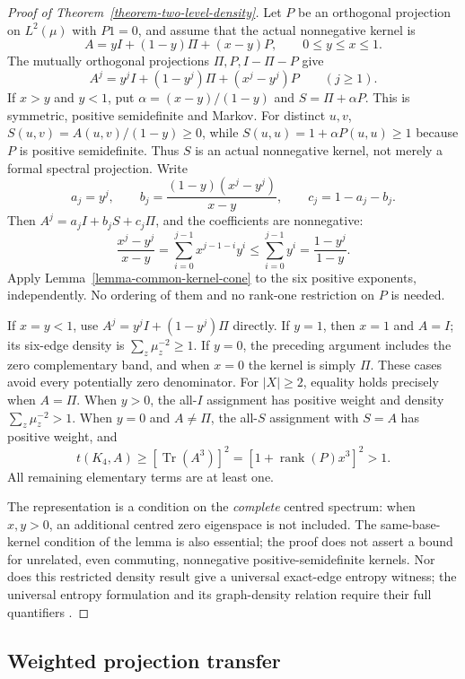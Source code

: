\documentclass[a4paper,11pt,reqno]{amsart}
\theoremstyle{plain}
\theoremstyle{definition}
\theoremstyle{remark}
\begin{document}
\begin{proof}[Proof of Theorem~\ref{theorem-two-level-density}]
Let $P$ be an orthogonal projection on $L^2(\mu)$ with $P1=0$, and assume
that the actual nonnegative kernel is
\[
 A=yI+(1-y)\Pi+(x-y)P,\qquad 0\le y\le x\le1.
\]
The mutually orthogonal projections $\Pi,P,I-\Pi-P$ give
\[
 A^j=y^jI+(1-y^j)\Pi+(x^j-y^j)P\qquad(j\ge1).
\]
If $x>y$ and $y<1$, put
$\alpha=(x-y)/(1-y)$ and $S=\Pi+\alpha P$.
This is symmetric, positive semidefinite and Markov.  For distinct
$u,v$, $S(u,v)=A(u,v)/(1-y)\ge0$, while
$S(u,u)=1+\alpha P(u,u)\ge1$ because $P$ is positive semidefinite.
Thus $S$ is an actual nonnegative kernel, not merely a formal spectral
projection.  Write
\[
 a_j=y^j,\qquad b_j=\frac{(1-y)(x^j-y^j)}{x-y},\qquad
 c_j=1-a_j-b_j.
\]
Then $A^j=a_jI+b_jS+c_j\Pi$, and the coefficients are nonnegative:
\[
 \frac{x^j-y^j}{x-y}
   =\sum_{i=0}^{j-1}x^{j-1-i}y^i
   \le\sum_{i=0}^{j-1}y^i=\frac{1-y^j}{1-y}.
\]
Apply Lemma~\ref{lemma-common-kernel-cone} to the six positive exponents,
independently.  No ordering of them and no rank-one restriction on $P$
is needed.

If $x=y<1$, use $A^j=y^jI+(1-y^j)\Pi$ directly.  If $y=1$, then
$x=1$ and $A=I$; its six-edge density is
$\sum_z\mu_z^{-2}\ge1$.  If $y=0$, the preceding argument includes
the zero complementary band, and when $x=0$ the kernel is simply $\Pi$.
These cases avoid every potentially zero denominator.
For $|X|\ge2$, equality holds precisely when $A=\Pi$.
When $y>0$, the all-$I$ assignment has positive weight and density
$\sum_z\mu_z^{-2}>1$.  When $y=0$ and $A\ne\Pi$, the all-$S$
assignment with $S=A$ has positive weight, and
\[
 t(K_4,A)\ge[\operatorname{Tr}(A^3)]^2
           =[1+\operatorname{rank}(P)x^3]^2>1.
\]
All remaining elementary terms are at least one.

The representation is a condition on the \emph{complete} centred spectrum:
when $x,y>0$, an additional centred zero eigenspace is not included.
The same-base-kernel condition of the lemma is also essential; the proof
does not assert a bound for unrelated, even commuting, nonnegative
positive-semidefinite kernels.  Nor does this restricted density result
give a universal exact-edge entropy witness; the universal entropy
formulation and its graph-density relation require their full quantifiers
\citep{szegedy2015}.
\end{proof}

\subsection{Weighted projection transfer}
\label{appendix-weighted-projection}
\end{document}
